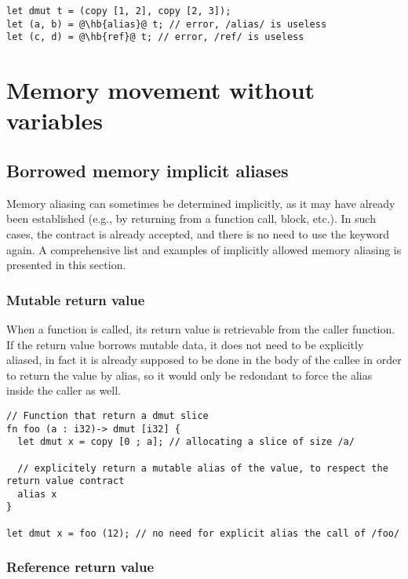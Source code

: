 \begin{lstlisting}[style=coloredverbatim, escapechar=@]
let dmut t = (copy [1, 2], copy [2, 3]);
let (a, b) = @\hb{alias}@ t; // error, /alias/ is useless
let (c, d) = @\hb{ref}@ t; // error, /ref/ is useless
\end{lstlisting}

\vfill%
\pagebreak

\section {Memory movement without variables}
\subsection{Borrowed memory implicit aliases}

Memory aliasing can sometimes be determined implicitly, as it may have already
been established (e.g., by returning from a function call, block, etc.). In such
cases, the contract is already accepted, and there is no need to use the keyword
 again. A comprehensive list and examples of implicitly allowed
memory aliasing is presented in this section.

\subsubsection*{Mutable return value}

When a function is called, its return value is retrievable from the caller
function. If the return value borrows mutable data, it does not need to be
explicitly aliased, in fact it is already supposed to be done in the body of the
callee in order to return the value by alias, so it would only be redondant to
force the alias inside the caller as well.

\begin{lstlisting}[style=coloredverbatim]
// Function that return a dmut slice
fn foo (a : i32)-> dmut [i32] {
  let dmut x = copy [0 ; a]; // allocating a slice of size /a/

  // explicitely return a mutable alias of the value, to respect the return value contract
  alias x
}

let dmut x = foo (12); // no need for explicit alias the call of /foo/
\end{lstlisting}

\subsubsection*{Reference return value}


